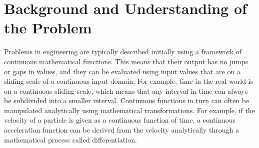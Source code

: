 \documentclass[12pt]{article}
\begin{document}
%
%




    \newpage
    \tableofcontents
    \newpage


    \section{Background and Understanding of the Problem}


    Problems in engineering are typically described initially using a framework of continuous mathematical functions.
    This means that their output has no jumps or gaps in values, and they can be evaluated using input values that are on a sliding scale of a continuous input domain.
    For example, time in the real world is on a continuous sliding scale, which means that any interval in time can always be subdivided into a smaller interval.
    Continuous functions in turn can often be manipulated analytically using mathematical transformations.
    For example, if the velocity of a particle is given as a continuous function of time, a continuous acceleration function can be derived from the velocity analytically through a mathematical process called differentiation.
\end{document}

